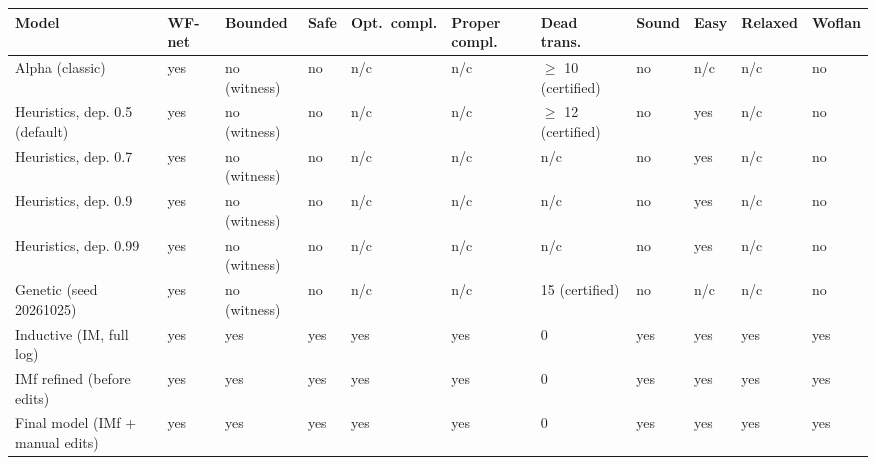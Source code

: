 \begin{tabular}{lllllllllll}
\hline
Model & WF-net & Bounded & Safe & Opt.\ compl. & Proper compl. & Dead trans. & Sound & Easy & Relaxed & Woflan \\
\hline
Alpha (classic) & yes & no (witness) & no & n/c & n/c & $\geq$ 10 (certified) & no & n/c & n/c & no \\
Heuristics, dep. 0.5 (default) & yes & no (witness) & no & n/c & n/c & $\geq$ 12 (certified) & no & yes & n/c & no \\
Heuristics, dep. 0.7 & yes & no (witness) & no & n/c & n/c & n/c & no & yes & n/c & no \\
Heuristics, dep. 0.9 & yes & no (witness) & no & n/c & n/c & n/c & no & yes & n/c & no \\
Heuristics, dep. 0.99 & yes & no (witness) & no & n/c & n/c & n/c & no & yes & n/c & no \\
Genetic (seed 20261025) & yes & no (witness) & no & n/c & n/c & 15 (certified) & no & n/c & n/c & no \\
Inductive (IM, full log) & yes & yes & yes & yes & yes & 0 & yes & yes & yes & yes \\
IMf refined (before edits) & yes & yes & yes & yes & yes & 0 & yes & yes & yes & yes \\
Final model (IMf + manual edits) & yes & yes & yes & yes & yes & 0 & yes & yes & yes & yes \\
\hline
\end{tabular}
